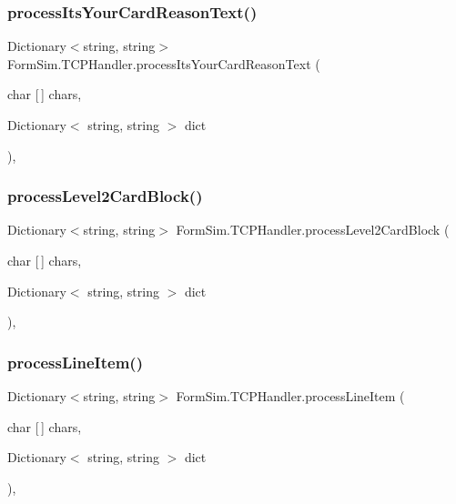 \subsubsection{\texorpdfstring{process\+Its\+Your\+Card\+Reason\+Text()}{processItsYourCardReasonText()}}
{\footnotesize\ttfamily Dictionary$<$string, string$>$ Form\+Sim.\+T\+C\+P\+Handler.\+process\+Its\+Your\+Card\+Reason\+Text (\begin{DoxyParamCaption}\item[{char \mbox{[}$\,$\mbox{]}}]{chars,  }\item[{Dictionary$<$ string, string $>$}]{dict }\end{DoxyParamCaption})\hspace{0.3cm}{\ttfamily [inline]}, {\ttfamily [private]}}

\mbox{\label{class_form_sim_1_1_t_c_p_handler_a68b477773fadcaaea8be6b8da1bfb0a5}} 
\subsubsection{\texorpdfstring{process\+Level2\+Card\+Block()}{processLevel2CardBlock()}}
{\footnotesize\ttfamily Dictionary$<$string, string$>$ Form\+Sim.\+T\+C\+P\+Handler.\+process\+Level2\+Card\+Block (\begin{DoxyParamCaption}\item[{char \mbox{[}$\,$\mbox{]}}]{chars,  }\item[{Dictionary$<$ string, string $>$}]{dict }\end{DoxyParamCaption})\hspace{0.3cm}{\ttfamily [inline]}, {\ttfamily [private]}}

\mbox{\label{class_form_sim_1_1_t_c_p_handler_a36fbcafba09f1511127e2ceaa0dac92b}} 
\subsubsection{\texorpdfstring{process\+Line\+Item()}{processLineItem()}}
{\footnotesize\ttfamily Dictionary$<$string, string$>$ Form\+Sim.\+T\+C\+P\+Handler.\+process\+Line\+Item (\begin{DoxyParamCaption}\item[{char \mbox{[}$\,$\mbox{]}}]{chars,  }\item[{Dictionary$<$ string, string $>$}]{dict }\end{DoxyParamCaption})\hspace{0.3cm}{\ttfamily [inline]}, {\ttfamily [private]}}

